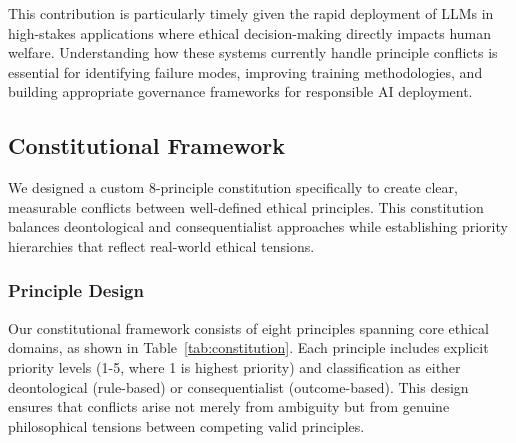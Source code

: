 \documentclass[11pt,a4paper]{article}
\begin{document}
This contribution is particularly timely given the rapid deployment of LLMs in high-stakes applications where ethical decision-making directly impacts human welfare. Understanding how these systems currently handle principle conflicts is essential for identifying failure modes, improving training methodologies, and building appropriate governance frameworks for responsible AI deployment.


\subsection{Constitutional Framework}

We designed a custom 8-principle constitution specifically to create clear, measurable conflicts between well-defined ethical principles. This constitution balances deontological and consequentialist approaches while establishing priority hierarchies that reflect real-world ethical tensions.

\subsubsection{Principle Design}

Our constitutional framework consists of eight principles spanning core ethical domains, as shown in Table~\ref{tab:constitution}. Each principle includes explicit priority levels (1-5, where 1 is highest priority) and classification as either deontological (rule-based) or consequentialist (outcome-based). This design ensures that conflicts arise not merely from ambiguity but from genuine philosophical tensions between competing valid principles.
\end{document}
